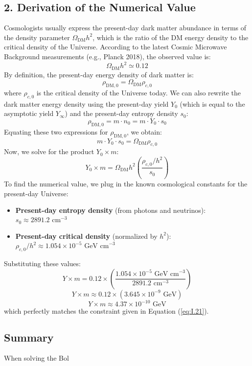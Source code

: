 \documentclass[11pt,a4paper]{article}
\begin{document}
\subsection*{2. Derivation of the Numerical Value}
Cosmologists usually express the present-day dark matter abundance in terms of the density parameter $\Omega_{\text{DM}} h^2$, which is the ratio of the DM energy density to the critical density of the Universe. According to the latest Cosmic Microwave Background measurements (e.g., Planck 2018), the observed value is:
\begin{equation}
    \Omega_{\text{DM}} h^2 \simeq 0.12
\end{equation}
By definition, the present-day energy density of dark matter is:
\begin{equation}
    \rho_{\text{DM},0} = \Omega_{\text{DM}} \rho_{c,0}
\end{equation}
where $\rho_{c,0}$ is the critical density of the Universe today. We can also rewrite the dark matter energy density using the present-day yield $Y_0$ (which is equal to the asymptotic yield $Y_\infty$) and the present-day entropy density $s_0$:
\begin{equation}
    \rho_{\text{DM},0} = m \cdot n_0 = m \cdot Y_0 \cdot s_0
\end{equation}
Equating these two expressions for $\rho_{\text{DM},0}$, we obtain:
\begin{equation}
    m \cdot Y_0 \cdot s_0 = \Omega_{\text{DM}} \rho_{c,0}
\end{equation}
Now, we solve for the product $Y_0 \times m$:
\begin{equation}
    Y_0 \times m = \Omega_{\text{DM}} h^2 \left( \frac{\rho_{c,0}/h^2}{s_0} \right)
\end{equation}
To find the numerical value, we plug in the known cosmological constants for the present-day Universe:
\begin{itemize}
    \item \textbf{Present-day entropy density} (from photons and neutrinos): $s_0 \approx 2891.2 \text{ cm}^{-3}$
    \item \textbf{Present-day critical density} (normalized by $h^2$): $\rho_{c,0}/h^2 \approx 1.054 \times 10^{-5} \text{ GeV cm}^{-3}$
\end{itemize}
Substituting these values:
\begin{equation}
    Y \times m = 0.12 \times \left( \frac{1.054 \times 10^{-5} \text{ GeV cm}^{-3}}{2891.2 \text{ cm}^{-3}} \right)
\end{equation}
\begin{equation}
    Y \times m \approx 0.12 \times \left( 3.645 \times 10^{-9} \text{ GeV} \right)
\end{equation}
\begin{equation}
    Y \times m \approx 4.37 \times 10^{-10} \text{ GeV}
\end{equation}
which perfectly matches the constraint given in Equation (\ref{eq:I.21}).

\subsection*{Summary}
When solving the Bol
\end{document}
